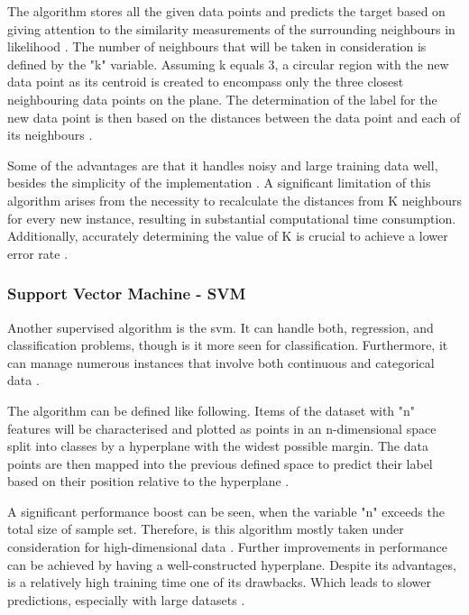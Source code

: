 The algorithm stores all the given data points and predicts the target based on giving attention to the similarity measurements of the surrounding neighbours in likelihood \citep{sen_supervised_2020}. The number of neighbours that will be taken in consideration is defined by the "k" variable. Assuming k equals 3, a circular region with the new data point as its centroid is created to encompass only the three closest neighbouring data points on the plane. The determination of the label for the new data point is then based on the distances between the data point and each of its neighbours \citep{sen_supervised_2020}.

Some of the advantages are that it handles noisy and large training data well, besides the simplicity of the implementation \citep{sen_supervised_2020}. A significant limitation of this algorithm arises from the necessity to recalculate the distances from K neighbours for every new instance, resulting in substantial computational time consumption. Additionally, accurately determining the value of K is crucial to achieve a lower error rate \citep{sen_supervised_2020}.

\subsubsection{Support Vector Machine - SVM}
Another supervised algorithm is the \ac{svm}. It can handle both, regression, and classification problems, though is it more seen for classification. Furthermore, it can manage numerous instances that involve both continuous and categorical data \citep{sen_supervised_2020}.

The algorithm can be defined like following. Items of the dataset with "n" features will be characterised and plotted as points in an n-dimensional space split into classes by a hyperplane with the widest possible margin. The data points are then mapped into the previous defined space to predict their label based on their position relative to the hyperplane \citep{sen_supervised_2020}.

A significant performance boost can be seen, when the variable "n" exceeds the total size of sample set. Therefore, is this algorithm mostly taken under consideration for high-dimensional data \citep{sen_supervised_2020}. Further improvements in performance can be achieved by having a well-constructed hyperplane. Despite its advantages, is a relatively high training time one of its drawbacks. Which leads to slower predictions, especially with large datasets \citep{sen_supervised_2020}.


